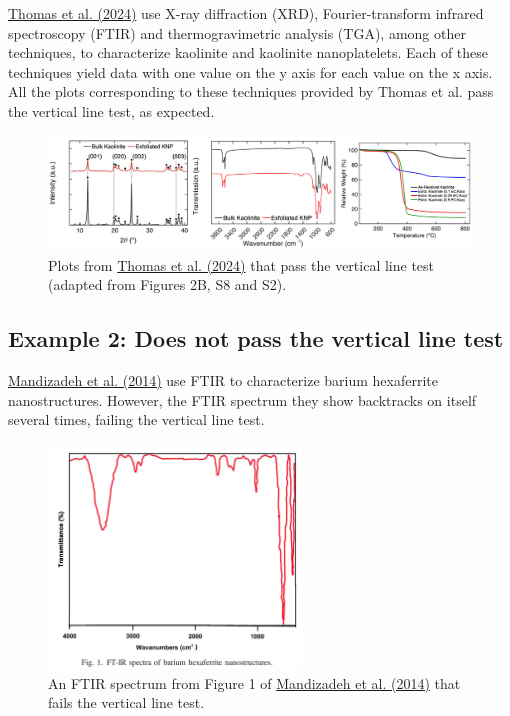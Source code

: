 \documentclass[letterpaper, 12pt]{article}
\begin{document}
\href{https://doi.org/10.1021/acsami.4c03997}{Thomas et al. (2024)} use X-ray diffraction (XRD), Fourier-transform infrared spectroscopy (FTIR) and thermogravimetric analysis (TGA), among other techniques, to characterize kaolinite and kaolinite nanoplatelets. Each of these techniques yield data with one value on the y axis for each value on the x axis. All the plots corresponding to these techniques provided by Thomas et al. pass the vertical line test, as expected.

\begin{figure}[h!tbp]
    \centering
    \includegraphics[width=\textwidth]{img/vertical_line/thomas_et_al_mockup.png}
    \caption*{Plots from \href{https://doi.org/10.1021/acsami.4c03997}{Thomas et al. (2024)} that pass the vertical line test (adapted from Figures 2B, S8 and S2).}
\end{figure}

\subsection*{Example 2: Does not pass the vertical line test}

\href{https://doi.org/10.1016/j.ceramint.2014.07.091}{Mandizadeh et al. (2014)} use FTIR to characterize barium hexaferrite nanostructures. However, the FTIR spectrum they show backtracks on itself several times, failing the vertical line test.

\begin{figure}[h!tbp]
    \centering
    \includegraphics[width=0.6\textwidth]{img/vertical_line/mandizaeh_ftir.png}
    \caption*{An FTIR spectrum from Figure 1 of \href{https://doi.org/10.1016/j.ceramint.2014.07.091}{Mandizadeh et al. (2014)} that fails the vertical line test.}
\end{figure}
\end{document}
